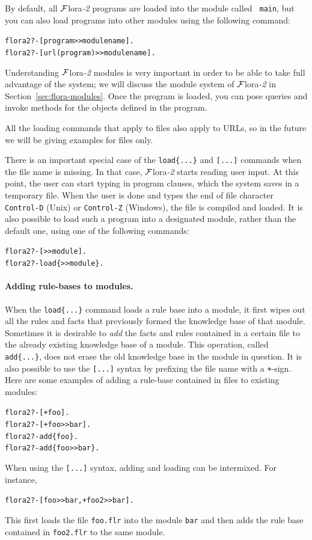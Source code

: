 \documentclass[11pt]{article}
\newcommand{\FLSYSTEM}{{\mbox{\sc ${\cal F}${lora}\rm\emph{-2}}}\xspace}
\newcommand{\prompt}{flora2 ?- }
\newcommand{\flrext}{flr}
\begin{document}
\ifdef{\isfloraman}{}
{
    
}


By default, all \FLSYSTEM programs are loaded into the module called {\tt
  main}, but you can also load programs into other modules using the following
command:
\begin{alltt}
  \prompt  [program>{}>modulename].
  \prompt  [url(program)>{}>modulename].
\end{alltt}
Understanding \FLSYSTEM modules is very important in order to be able to take
full advantage of the system; we will discuss the module system of \FLSYSTEM
in Section~\ref{sec:flora-modules}.  Once the program is loaded, you can
pose queries and invoke methods for the objects defined in the program.

All the loading commands that apply to files also apply to URLs, so in the
future we will be giving examples for files only.

There is an important special case of the {\tt load\{...\}} and {\tt [...]}
commands when the file name is missing. In that case,
\FLSYSTEM starts reading user
input. At this point, the user can start typing in program clauses, which
the system saves in a temporary file. When the user is done and types the
end of file character {\tt Control-D} (Unix) or {\tt Control-Z} (Windows),
the file is compiled and loaded. It is also possible to load such a program
into a designated module, rather than the default one, using one of the
following commands:
\begin{alltt}
  \prompt [>{}>module].
  \prompt load\{>{}>module\}.
\end{alltt}

\paragraph{Adding rule-bases to modules.}
When the {\tt load\{...\}} command loads a rule base into a module, it first wipes
out all the rules and facts that previously formed the knowledge base of
that module. Sometimes it is desirable to \emph{add} the facts and
rules contained in a certain file to the already existing knowledge base of
a module. This operation, called {\tt add\{...\}}, does not erase the old
knowledge base in the module in question.  It is also possible to use the
{\tt [...]} syntax by prefixing the file name with a {\tt +}-sign. Here are
some examples of adding a rule-base contained in files to existing
modules:
\index{\tt [file]}
\begin{alltt}
     \prompt [+foo].
     \prompt [+foo>{}>bar].
     \prompt add\{foo\}.
     \prompt add\{foo>{}>bar\}.
\end{alltt}
When using the {\tt [...]} syntax, adding and loading can be
intermixed. For instance, 
\begin{alltt}
      \prompt [foo>{}>bar, +foo2>{}>bar].
\end{alltt}
This first loads the file {\tt foo.\flrext} into the module {\tt bar} and then
adds the rule base contained in {\tt foo2.\flrext} to the same module.
\end{document}
